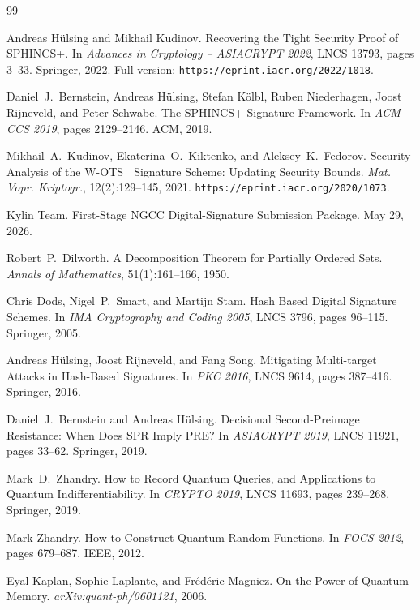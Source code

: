 \documentclass[11pt,a4paper]{article}
\begin{document}
\begin{thebibliography}{99}

Andreas H\"ulsing and Mikhail Kudinov.
\newblock Recovering the Tight Security Proof of {SPHINCS+}.
\newblock In \emph{Advances in Cryptology -- ASIACRYPT 2022}, LNCS 13793, pages 3--33. Springer, 2022.
\newblock Full version: \texttt{https://eprint.iacr.org/2022/1018}.

Daniel~J.\ Bernstein, Andreas H\"ulsing, Stefan K\"olbl, Ruben Niederhagen, Joost Rijneveld, and Peter Schwabe.
\newblock The {SPHINCS+} Signature Framework.
\newblock In \emph{ACM CCS 2019}, pages 2129--2146. ACM, 2019.

Mikhail~A.\ Kudinov, Ekaterina~O.\ Kiktenko, and Aleksey~K.\ Fedorov.
\newblock Security Analysis of the {W-OTS$^+$} Signature Scheme: Updating Security Bounds.
\newblock \emph{Mat. Vopr. Kriptogr.}, 12(2):129--145, 2021.
\newblock \texttt{https://eprint.iacr.org/2020/1073}.

Kylin Team.
 First-Stage {NGCC} Digital-Signature Submission Package.
\newblock May 29, 2026.

Robert~P.\ Dilworth.
\newblock A Decomposition Theorem for Partially Ordered Sets.
\newblock \emph{Annals of Mathematics}, 51(1):161--166, 1950.

Chris Dods, Nigel~P.\ Smart, and Martijn Stam.
\newblock Hash Based Digital Signature Schemes.
\newblock In \emph{IMA Cryptography and Coding 2005}, LNCS 3796, pages 96--115. Springer, 2005.

Andreas H\"ulsing, Joost Rijneveld, and Fang Song.
\newblock Mitigating Multi-target Attacks in Hash-Based Signatures.
\newblock In \emph{PKC 2016}, LNCS 9614, pages 387--416. Springer, 2016.

Daniel~J.\ Bernstein and Andreas H\"ulsing.
\newblock Decisional Second-Preimage Resistance: When Does {SPR} Imply {PRE}?
\newblock In \emph{ASIACRYPT 2019}, LNCS 11921, pages 33--62. Springer, 2019.

Mark~D.\ Zhandry.
\newblock How to Record Quantum Queries, and Applications to Quantum Indifferentiability.
\newblock In \emph{CRYPTO 2019}, LNCS 11693, pages 239--268. Springer, 2019.

Mark Zhandry.
\newblock How to Construct Quantum Random Functions.
\newblock In \emph{FOCS 2012}, pages 679--687. IEEE, 2012.

Eyal Kaplan, Sophie Laplante, and Fr\'ed\'eric Magniez.
\newblock On the Power of Quantum Memory.
\newblock \emph{arXiv:quant-ph/0601121}, 2006.

\end{thebibliography}
\end{document}
